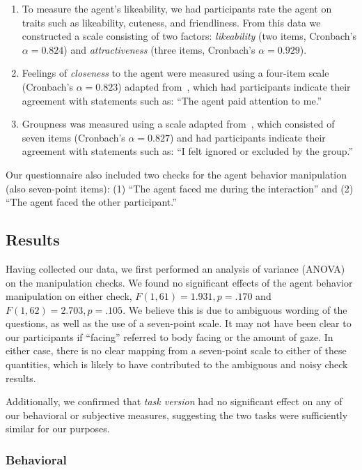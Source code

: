 \begin{enumerate}
\item To measure the agent's likeability, we had participants rate the agent on traits such as likeability, cuteness, and friendliness. From this data we constructed a scale consisting of two factors: \emph{likeability} (two items, Cronbach's $\alpha = 0.824$) and \emph{attractiveness} (three items, Cronbach's $\alpha = 0.929$).
\item Feelings of \emph{closeness} to the agent were measured using a four-item scale (Cronbach's $\alpha = 0.823$) adapted from~\citep{aron1992inclusion}, which had participants indicate their agreement with statements such as: ``The agent paid attention to me.''
\item Groupness was measured using a scale adapted from~\citep{williams2000cyberostracism}, which consisted of seven items (Cronbach's $\alpha = 0.827$) and had participants indicate their agreement with statements such as: ``I felt ignored or excluded by the group.''
\end{enumerate}

Our questionnaire also included two checks for the agent behavior manipulation (also seven-point items): (1) ``The agent faced me during the interaction'' and (2) ``The agent faced the other participant.''

\subsection{Results}

Having collected our data, we first performed an analysis of variance (ANOVA) on the manipulation checks. We found no significant effects of the agent behavior manipulation on either check, $F(1, 61) = 1.931, p = .170$ and $F(1, 62) = 2.703, p = .105$. We believe this is due to ambiguous wording of the questions, as well as the use of a seven-point scale. It may not have been clear to our participants if ``facing'' referred to body facing or the amount of gaze. In either case, there is no clear mapping from a seven-point scale to either of these quantities, which is likely to have contributed to the ambiguous and noisy check results.

Additionally, we confirmed that \emph{task version} had no significant effect on any of our behavioral or subjective measures, suggesting the two tasks were sufficiently similar for our purposes.

\subsubsection{Behavioral}

